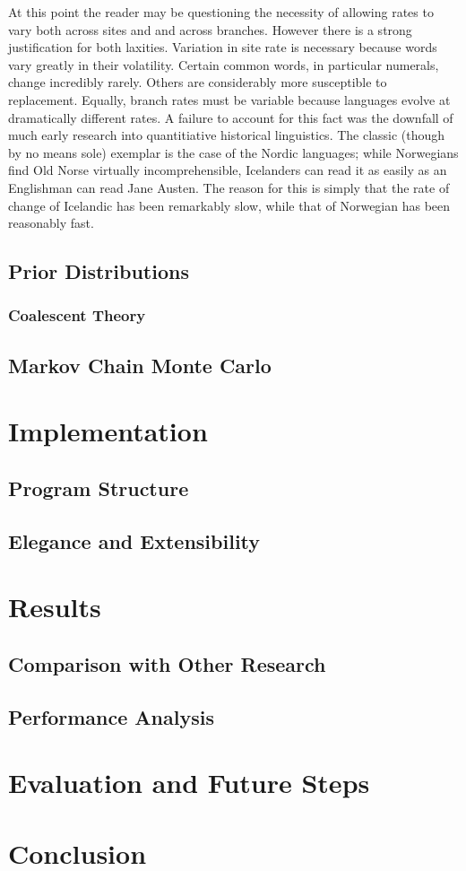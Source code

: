 \documentclass[10pt,journal,compsoc]{IEEEtran}
\begin{document}
At this point the reader may be questioning the necessity of allowing rates to vary both across sites and and across branches. However there is a strong justification for both laxities. Variation in site rate is necessary because words vary greatly in their volatility. Certain common words, in particular numerals, change incredibly rarely. Others are considerably more susceptible to replacement. Equally, branch rates must be variable because languages evolve at dramatically different rates. A failure to account for this fact was the downfall of much early research into quantitiative historical linguistics. The classic (though by no means sole) exemplar is the case of the Nordic languages; while Norwegians find Old Norse virtually incomprehensible, Icelanders can read it as easily as an Englishman can read Jane Austen. The reason for this is simply that the rate of change of Icelandic has been remarkably slow, while that of Norwegian has been reasonably fast.

\subsection{Prior Distributions}

\subsubsection{Coalescent Theory}

\subsection{Markov Chain Monte Carlo}

\section{Implementation}

\subsection{Program Structure}

\subsection{Elegance and Extensibility}

\section{Results}

\subsection{Comparison with Other Research}

\subsection{Performance Analysis}

\section{Evaluation and Future Steps}

\section{Conclusion}

\newpage



\end{document}
